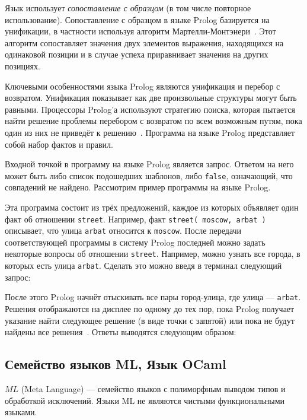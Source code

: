         Язык использует \textit{сопоставление с образцом} (в том числе повторное использование).
        Сопоставление с образцом в языке Prolog базируется на унификации, в частности используя алгоритм Мартелли-Монтэнери~\cite{unify}.
        Этот алгоритм сопоставляет значения двух элементов выражения, находящихся на одинаковой позиции и в случае успеха приравнивает значения на других позициях.

        Ключевыми особенностями языка Prolog являются унификация и перебор с возвратом.
        Унификация показывает как две произвольные структуры могут быть равными.
        Процессоры Prolog'а используют стратегию поиска, которая пытается найти решение проблемы перебором с возвратом по всем возможным путям, пока один из них не приведёт к решению~\cite{prolog}.
        Программа на языке Prolog представляет собой набор фактов и правил.

        Входной точкой в программу на языке Prolog является запрос.
        Ответом на него может быть либо список подошедших шаблонов, либо \verb!false!, означающий, что совпадений не найдено.
        \clearpage
        Рассмотрим пример программы на языке Prolog.

        

        Эта программа состоит из трёх предложений, каждое из которых объявляет один факт об отношении \verb$street$.
        Например, факт \verb$street( moscow, arbat )$ описывает, что улица \verb$arbat$ относится к \verb$moscow$.
        После передачи соответствующей программы в систему Prolog последней можно задать некоторые вопросы об отношении \verb$street$.
        Например, можно узнать все города, в которых есть улица \verb$arbat$.
        Сделать это можно введя в терминал следующий запрос:

        

        После этого Prolog начнёт отыскивать все пары город-улица, где улица --- \verb$arbat$.
        Решения отображаются на дисплее по одному до тех пор, пока Prolog получает указание найти следующее решение (в виде точки с запятой) или пока не будут найдены все решения~\cite{prolog_bratko}.
        Ответы выводятся следующим образом:

        

    \subsection{Семейство языков ML, Язык OCaml}
        $ML$ (Meta Language) --- семейство языков с полиморфным выводом типов и обработкой исключений.
        Языки ML не являются чистыми функциональными языками.
        
